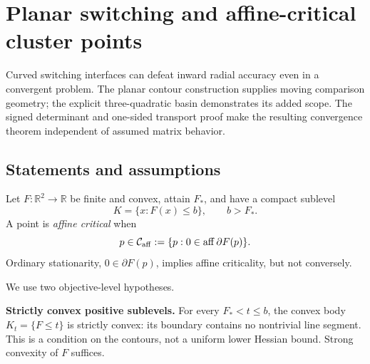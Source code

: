 \chapter{Planar switching and affine-critical cluster points}\label{comp:C}\label{C:chapter}
\renewcommand{\ModuleTag}{9}
Curved switching interfaces can defeat inward radial accuracy even in a convergent problem. The planar contour construction supplies moving comparison geometry; the explicit three-quadratic basin demonstrates its added scope. The signed determinant and one-sided transport proof make the resulting convergence theorem independent of assumed matrix behavior.


\begingroup
\providecommand{\R}{}
\renewcommand{\R}{\mathbb R}
\providecommand{\aff}{}
\renewcommand{\aff}{\operatorname{aff}}
\providecommand{\conv}{}
\renewcommand{\conv}{\operatorname{conv}}
\providecommand{\tr}{}
\renewcommand{\tr}{\operatorname{tr}}
\providecommand{\dist}{}
\renewcommand{\dist}{\operatorname{dist}}
\providecommand{\Ca}{}
\renewcommand{\Ca}{\mathcal C_{\rm aff}}
\providecommand{\ip}{}
\renewcommand{\ip}[2]{\langle #1,#2\rangle}
\providecommand{\norm}{}
\renewcommand{\norm}[1]{\lVert #1\rVert}
\makeatletter\let\c@lemma\c@theorem\let\c@corollary\c@theorem\let\c@proposition\c@theorem\let\c@remark\c@theorem\makeatother
\renewcommand{\thelemma}{\thetheorem}\renewcommand{\thecorollary}{\thetheorem}\renewcommand{\theproposition}{\thetheorem}\renewcommand{\theremark}{\thetheorem}
\setcounter{section}{0}
\setcounter{theorem}{0}
\setcounter{equation}{0}


\section{Statements and assumptions}

Let $F:\R^2\to\R$ be finite and convex, attain $F_*$, and have a compact sublevel
\[
K=\{x:F(x)\le b\},\qquad b>F_*.
\]
A point is \emph{affine critical} when
\[
 p\in\Ca:=\{p:0\in\aff\partial F(p)\}.
\]
Ordinary stationarity, $0\in\partial F(p)$, implies affine criticality, but not conversely.

We use two objective-level hypotheses.

\textbf{Strictly convex positive sublevels.} For every $F_*<t\le b$, the convex body $K_t=\{F\le t\}$ is strictly convex: its boundary contains no nontrivial line segment. This is a condition on the contours, not a uniform lower Hessian bound. Strong convexity of $F$ suffices.

